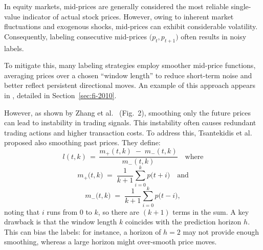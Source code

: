 In equity markets, mid-prices are generally considered the most reliable single-value indicator of actual stock prices. However, owing to inherent market fluctuations and exogenous shocks, mid-prices can exhibit considerable volatility. Consequently, labeling consecutive mid-prices $\bigl(p_t, p_{t+1}\bigr)$ often results in noisy labels.

To mitigate this, many labeling strategies employ smoother mid-price functions, averaging prices over a chosen ``window length'' to reduce short-term noise and better reflect persistent directional moves. An example of this approach appears in \cite{urn:nbn:fi:csc-kata20170601153214969115}, detailed in Section~\ref{sec:fi-2010}.

However, as shown by Zhang et al.~\cite{zhang2019deeplob} (Fig.~2), smoothing only the future prices can lead to instability in trading signals. This instability often causes redundant trading actions and higher transaction costs. To address this, Tsantekidis et al.~\cite{tsantekidis2017forecasting} proposed also smoothing past prices. They define:
\begin{equation}
l(t, k) 
\,=\, \frac{m_+(t, k) \;-\; m_-(t, k)}{m_-(t, k)} 
\quad\text{where}
\end{equation}
\begin{equation}
m_+\bigl(t, k\bigr) \;=\; \frac{1}{k+1}\sum_{i=0}^k p\bigl(t + i\bigr)\quad\text{and}
\end{equation}
\begin{equation}
m_-\bigl(t, k\bigr) \;=\; \frac{1}{k+1}\sum_{i=0}^k p\bigl(t - i\bigr),
\end{equation}
noting that $i$ runs from $0$ to $k$, so there are $(k+1)$ terms in the sum. A key drawback is that the window length $k$ coincides with the prediction horizon $h$. This can bias the labels: for instance, a horizon of $h=2$ may not provide enough smoothing, whereas a large horizon might over-smooth price moves.

